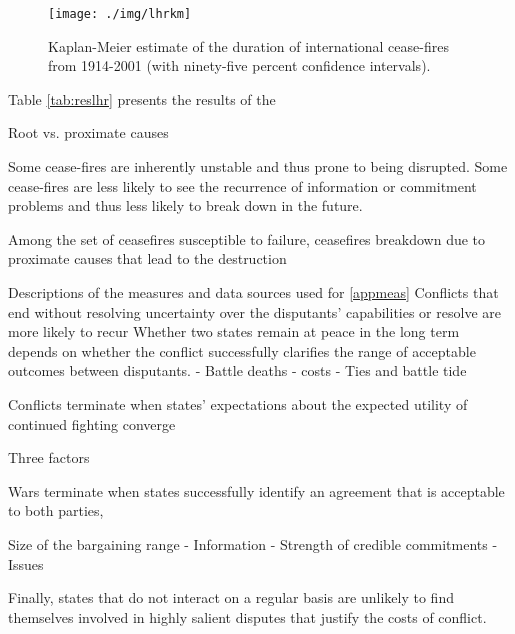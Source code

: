 \documentclass{article}
\begin{document}
	\begin{figure}[htbp]\centering
		\caption{Kaplan-Meier estimate of the duration of international cease-fires from 1914-2001 (with ninety-five percent confidence intervals).}
		\texttt{[image: ./img/lhrkm]}
		\label{fig:lhrkm}
	\end{figure}


Table \ref{tab:reslhr} presents the results of the 






Root vs. proximate causes

Some cease-fires are inherently unstable and thus prone to being disrupted. Some cease-fires are less likely to see the recurrence of information or commitment problems and thus less likely to break down in the future.

Among the set of ceasefires susceptible to failure, ceasefires breakdown due to proximate causes that lead to the destruction

Descriptions of the measures and data sources used for \ref{appmeas}
Conflicts that end without resolving uncertainty over the disputants' capabilities or resolve are more likely to recur 
Whether two states remain at peace in the long term depends on whether the conflict successfully clarifies the range of acceptable outcomes between disputants. 
- Battle deaths - costs
- Ties and battle tide



Conflicts terminate when states' expectations about the expected utility of continued fighting converge



Three factors 



Wars terminate when states successfully identify an agreement that is acceptable to both parties, 



Size of the bargaining range
- Information
- Strength of credible commitments
- Issues

Finally, states that do not interact on a regular basis are unlikely to find themselves involved in highly salient disputes that justify the costs of conflict. 
\end{document}
